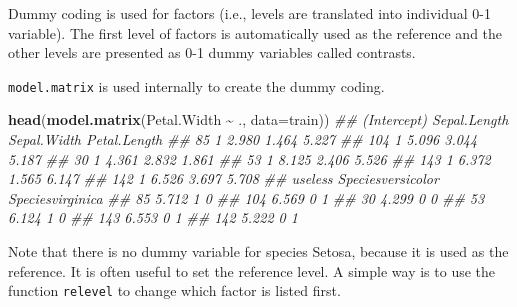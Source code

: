 \documentclass[
  notitlepage]{book}
\newenvironment{Shaded}{\begin{snugshade}}{\end{snugshade}}
\newcommand{\CommentTok}[1]{\textcolor[rgb]{0.56,0.35,0.01}{\textit{#1}}}
\newcommand{\DataTypeTok}[1]{\textcolor[rgb]{0.13,0.29,0.53}{#1}}
\newcommand{\KeywordTok}[1]{\textcolor[rgb]{0.13,0.29,0.53}{\textbf{#1}}}
\newcommand{\NormalTok}[1]{#1}
\newcommand{\OperatorTok}[1]{\textcolor[rgb]{0.81,0.36,0.00}{\textbf{#1}}}
\newcommand{\StringTok}[1]{\textcolor[rgb]{0.31,0.60,0.02}{#1}}
\begin{document}
Dummy coding is used for factors
(i.e., levels are translated into individual 0-1 variable).
The first level of factors is automatically used as the reference and
the other levels are presented as 0-1 dummy variables called contrasts.

\begin{Shaded}
\end{Shaded}

\texttt{model.matrix} is used internally to create the dummy coding.

\begin{Shaded}
\begin{Highlighting}[]
\KeywordTok{head}\NormalTok{(}\KeywordTok{model.matrix}\NormalTok{(Petal.Width }\OperatorTok{\textasciitilde{}}\StringTok{ }\NormalTok{., }\DataTypeTok{data=}\NormalTok{train))}
\CommentTok{\#\#     (Intercept) Sepal.Length Sepal.Width Petal.Length}
\CommentTok{\#\# 85            1        2.980       1.464        5.227}
\CommentTok{\#\# 104           1        5.096       3.044        5.187}
\CommentTok{\#\# 30            1        4.361       2.832        1.861}
\CommentTok{\#\# 53            1        8.125       2.406        5.526}
\CommentTok{\#\# 143           1        6.372       1.565        6.147}
\CommentTok{\#\# 142           1        6.526       3.697        5.708}
\CommentTok{\#\#     useless Speciesversicolor Speciesvirginica}
\CommentTok{\#\# 85    5.712                 1                0}
\CommentTok{\#\# 104   6.569                 0                1}
\CommentTok{\#\# 30    4.299                 0                0}
\CommentTok{\#\# 53    6.124                 1                0}
\CommentTok{\#\# 143   6.553                 0                1}
\CommentTok{\#\# 142   5.222                 0                1}
\end{Highlighting}
\end{Shaded}

Note that there is no dummy variable for species Setosa, because it is
used as the reference. It is often useful to set the reference level.
A simple way is to use the
function \texttt{relevel} to change which factor is listed first.
\end{document}
